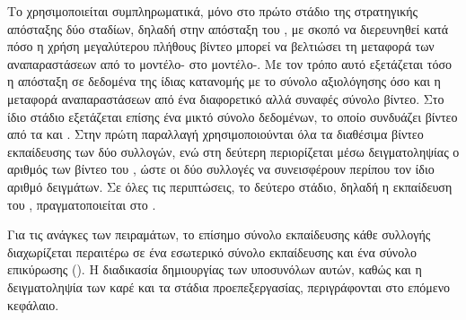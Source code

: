 Το  χρησιμοποιείται συμπληρωματικά, μόνο στο πρώτο στάδιο της
στρατηγικής απόσταξης δύο σταδίων, δηλαδή στην απόσταξη του
, με σκοπό να διερευνηθεί κατά πόσο η χρήση μεγαλύτερου
πλήθους βίντεο μπορεί να βελτιώσει τη μεταφορά των αναπαραστάσεων από
το μοντέλο- στο μοντέλο-. Με τον τρόπο αυτό εξετάζεται τόσο η απόσταξη σε δεδομένα της ίδιας
κατανομής με το σύνολο αξιολόγησης όσο και η μεταφορά αναπαραστάσεων από
ένα διαφορετικό αλλά συναφές σύνολο βίντεο. Στο ίδιο στάδιο
εξετάζεται επίσης ένα μικτό σύνολο δεδομένων, το οποίο συνδυάζει βίντεο
από τα  και . Στην πρώτη παραλλαγή
χρησιμοποιούνται όλα τα διαθέσιμα βίντεο εκπαίδευσης των δύο συλλογών,
ενώ στη δεύτερη περιορίζεται μέσω δειγματοληψίας ο αριθμός των βίντεο
του , ώστε οι δύο συλλογές να συνεισφέρουν περίπου τον ίδιο
αριθμό δειγμάτων. Σε όλες τις περιπτώσεις, το δεύτερο στάδιο, δηλαδή η
εκπαίδευση του , πραγματοποιείται στο
.

Για τις ανάγκες των πειραμάτων, το επίσημο σύνολο εκπαίδευσης κάθε
συλλογής διαχωρίζεται περαιτέρω σε ένα εσωτερικό σύνολο εκπαίδευσης και
ένα σύνολο επικύρωσης (). Η διαδικασία δημιουργίας των
υποσυνόλων αυτών, καθώς και η δειγματοληψία των καρέ και τα
στάδια προεπεξεργασίας, περιγράφονται στο επόμενο κεφάλαιο.
